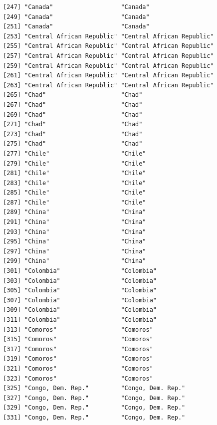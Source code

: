 \documentclass[
  letterpaper,
  DIV=11,
  numbers=noendperiod]{scrreprt}
\begin{document}
\begin{verbatim}
 [247] "Canada"                   "Canada"                  
 [249] "Canada"                   "Canada"                  
 [251] "Canada"                   "Canada"                  
 [253] "Central African Republic" "Central African Republic"
 [255] "Central African Republic" "Central African Republic"
 [257] "Central African Republic" "Central African Republic"
 [259] "Central African Republic" "Central African Republic"
 [261] "Central African Republic" "Central African Republic"
 [263] "Central African Republic" "Central African Republic"
 [265] "Chad"                     "Chad"                    
 [267] "Chad"                     "Chad"                    
 [269] "Chad"                     "Chad"                    
 [271] "Chad"                     "Chad"                    
 [273] "Chad"                     "Chad"                    
 [275] "Chad"                     "Chad"                    
 [277] "Chile"                    "Chile"                   
 [279] "Chile"                    "Chile"                   
 [281] "Chile"                    "Chile"                   
 [283] "Chile"                    "Chile"                   
 [285] "Chile"                    "Chile"                   
 [287] "Chile"                    "Chile"                   
 [289] "China"                    "China"                   
 [291] "China"                    "China"                   
 [293] "China"                    "China"                   
 [295] "China"                    "China"                   
 [297] "China"                    "China"                   
 [299] "China"                    "China"                   
 [301] "Colombia"                 "Colombia"                
 [303] "Colombia"                 "Colombia"                
 [305] "Colombia"                 "Colombia"                
 [307] "Colombia"                 "Colombia"                
 [309] "Colombia"                 "Colombia"                
 [311] "Colombia"                 "Colombia"                
 [313] "Comoros"                  "Comoros"                 
 [315] "Comoros"                  "Comoros"                 
 [317] "Comoros"                  "Comoros"                 
 [319] "Comoros"                  "Comoros"                 
 [321] "Comoros"                  "Comoros"                 
 [323] "Comoros"                  "Comoros"                 
 [325] "Congo, Dem. Rep."         "Congo, Dem. Rep."        
 [327] "Congo, Dem. Rep."         "Congo, Dem. Rep."        
 [329] "Congo, Dem. Rep."         "Congo, Dem. Rep."        
 [331] "Congo, Dem. Rep."         "Congo, Dem. Rep."        

\end{verbatim}
\end{document}
